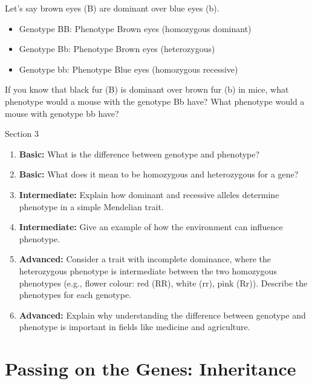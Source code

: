 \begin{example}
Let's say brown eyes (B) are dominant over blue eyes (b).

\begin{itemize}
    \item Genotype BB: Phenotype Brown eyes (homozygous dominant)
    \item Genotype Bb: Phenotype Brown eyes (heterozygous)
    \item Genotype bb: Phenotype Blue eyes (homozygous recessive)
\end{itemize}
\end{example}

\begin{stopandthink}
If you know that black fur (B) is dominant over brown fur (b) in mice, what phenotype would a mouse with the genotype Bb have? What phenotype would a mouse with genotype bb have?
\end{stopandthink}

\begin{tieredquestions}{Section 3}

\begin{enumerate}
    \item \textbf{Basic:} What is the difference between genotype and phenotype?
    \item \textbf{Basic:} What does it mean to be homozygous and heterozygous for a gene?
    \item \textbf{Intermediate:} Explain how dominant and recessive alleles determine phenotype in a simple Mendelian trait.
    \item \textbf{Intermediate:} Give an example of how the environment can influence phenotype.
    \item \textbf{Advanced:} Consider a trait with incomplete dominance, where the heterozygous phenotype is intermediate between the two homozygous phenotypes (e.g., flower colour: red (RR), white (rr), pink (Rr)). Describe the phenotypes for each genotype.
    \item \textbf{Advanced:}  Explain why understanding the difference between genotype and phenotype is important in fields like medicine and agriculture.
\end{enumerate}

\end{tieredquestions}


\section{Passing on the Genes: Inheritance}

